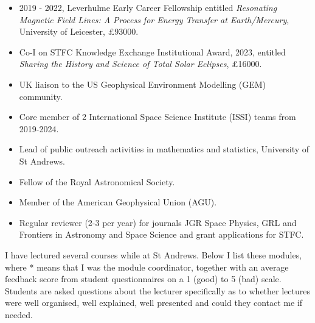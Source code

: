 \documentclass[11pt,a4paper]{article} %
\begin{document}

\begin{itemize}
\item 2019 - 2022, Leverhulme Early Career Fellowship entitled \textit{Resonating Magnetic Field Lines: A Process for Energy Transfer at Earth/Mercury}, University of Leicester, £93000. 
\vspace{-0.25cm} 
\item Co-I on STFC Knowledge Exchange Institutional Award, 2023, entitled \textit{Sharing the History and Science of Total Solar Eclipses}, £16000.
\vspace{-0.25cm} 
\item UK liaison to the US Geophysical Environment Modelling (GEM) community.
\vspace{-0.25cm} 
\item Core member of 2 International Space Science Institute (ISSI) teams from 2019-2024. 
\vspace{-0.25cm} 
\item Lead of public outreach activities in mathematics and statistics, University of St Andrews. 
\vspace{-0.25cm} 
\item Fellow of the Royal Astronomical Society.
\vspace{-0.25cm} 
\item Member of the American Geophysical Union (AGU).
\vspace{-0.25cm} 
\item Regular reviewer (2-3 per year) for journals JGR Space Physics, GRL and Frontiers in Astronomy and Space Science and grant applications for STFC.
\end{itemize}

\spacedhrule{-0.2em}{-0.4em} %


I have lectured several courses while at St Andrews. Below I list these modules, where * means that I was the module coordinator, together with an average feedback score from student questionnaires on a 1 (good) to 5 (bad) scale. Students are asked questions about the lecturer specifically as to whether lectures were well organised, well explained, well presented and could they contact me if needed.
\end{document}
